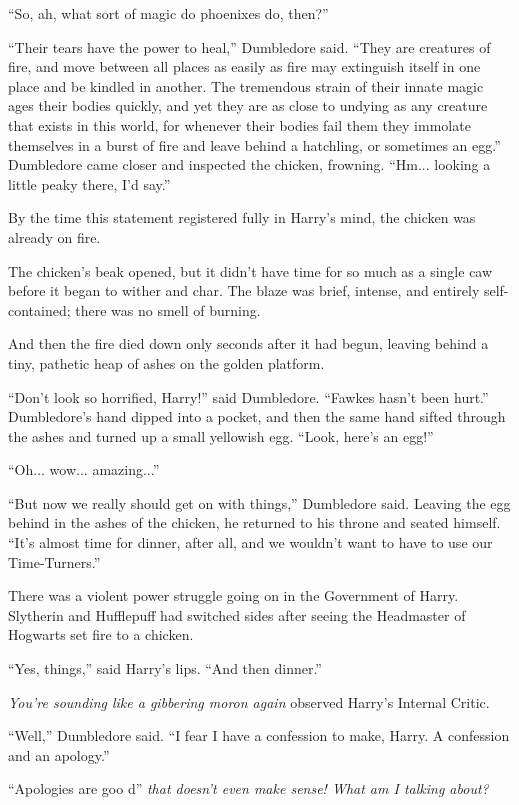 ``So, ah, what sort of magic do phoenixes do, then?''

``Their tears have the power to heal,'' Dumbledore said. ``They are creatures of fire, and move between all places as easily as fire may extinguish itself in one place and be kindled in another. The tremendous strain of their innate magic ages their bodies quickly, and yet they are as close to undying as any creature that exists in this world, for whenever their bodies fail them they immolate themselves in a burst of fire and leave behind a hatchling, or sometimes an egg.'' Dumbledore came closer and inspected the chicken, frowning. ``Hm... looking a little peaky there, I'd say.''

By the time this statement registered fully in Harry's mind, the chicken was already on fire.

The chicken's beak opened, but it didn't have time for so much as a single caw before it began to wither and char. The blaze was brief, intense, and entirely self-contained; there was no smell of burning.

And then the fire died down only seconds after it had begun, leaving behind a tiny, pathetic heap of ashes on the golden platform.

``Don't look so horrified, Harry!'' said Dumbledore. ``Fawkes hasn't been hurt.'' Dumbledore's hand dipped into a pocket, and then the same hand sifted through the ashes and turned up a small yellowish egg. ``Look, here's an egg!''

``Oh... wow... amazing...''

``But now we really should get on with things,'' Dumbledore said. Leaving the egg behind in the ashes of the chicken, he returned to his throne and seated himself. ``It's almost time for dinner, after all, and we wouldn't want to have to use our Time-Turners.''

There was a violent power struggle going on in the Government of Harry. Slytherin and Hufflepuff had switched sides after seeing the Headmaster of Hogwarts set fire to a chicken.

``Yes, things,'' said Harry's lips. ``And then dinner.''

\emph{You're sounding like a gibbering moron again} observed Harry's Internal Critic.

``Well,'' Dumbledore said. ``I fear I have a confession to make, Harry. A confession and an apology.''

``Apologies are goo d'' \emph{that doesn't even make sense! What am I talking about?}

